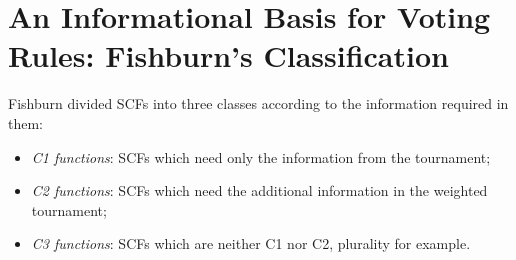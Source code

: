 \section{An Informational Basis for Voting Rules: Fishburn's Classification}

Fishburn divided SCFs into three classes according to the information required in them:
\begin{itemize}
    \item \textit{C1 functions}: SCFs which need only the information from the tournament;
    \item \textit{C2 functions}: SCFs which need the additional information in the weighted tournament;
    \item \textit{C3 functions}: SCFs which are neither C1 nor C2, plurality for example.
\end{itemize}